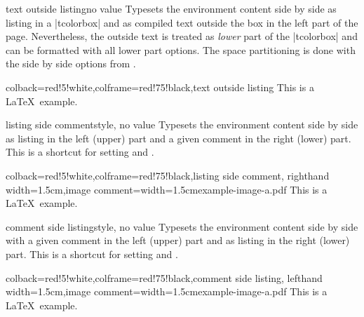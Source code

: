 \begin{docTcbKey}{text outside listing}{}{no value}
Typesets the environment content side by side as listing in a |tcolorbox|
and as compiled text outside the box in the left part of the page.
Nevertheless, the outside text is treated as \emph{lower} part of the
|tcolorbox| and can be formatted with all lower part options.
The space partitioning is done with the side by side options from
.
\begin{dispExample}
\begin{tcblisting}{colback=red!5!white,colframe=red!75!black,text outside listing}
This is a \LaTeX\ example.
\end{tcblisting}
\end{dispExample}
\end{docTcbKey}



\begin{docTcbKey}{listing side comment}{}{style, no value}
Typesets the environment content side by side as listing in the left (upper)
part and a given comment in the right (lower) part.
This is a shortcut for setting  and .
\begin{dispExample}
\begin{tcblisting}{colback=red!5!white,colframe=red!75!black,listing side comment,
  righthand width=1.5cm,image comment={width=1.5cm}{example-image-a.pdf}}
This is a \LaTeX\ example.
\end{tcblisting}
\end{dispExample}
\end{docTcbKey}


\begin{docTcbKey}{comment side listing}{}{style, no value}
Typesets the environment content side by side with a given comment in the left (upper)
part and as listing in the right (lower) part.
This is a shortcut for setting  and .
\begin{dispExample}
\begin{tcblisting}{colback=red!5!white,colframe=red!75!black,comment side listing,
  lefthand width=1.5cm,image comment={width=1.5cm}{example-image-a.pdf}}
This is a \LaTeX\ example.
\end{tcblisting}
\end{dispExample}
\end{docTcbKey}

\clearpage

